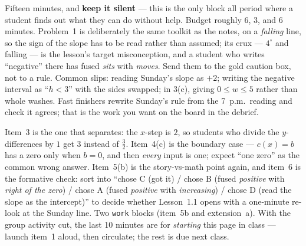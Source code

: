 \documentclass[10pt]{article}
\begin{document}
\begin{teachernote}
Fifteen minutes, and \textbf{keep it silent} --- this is the only block all period where a student
finds out what they can do without help. Budget roughly 6, 3, and 6 minutes. Problem~1 is
deliberately the same toolkit as the notes, on a \emph{falling} line, so the sign of the slope has
to be read rather than assumed; its crux --- $4^\circ$ and falling --- is the lesson's target
misconception, and a student who writes ``negative'' there has fused \emph{sits} with \emph{moves}.
Send them to the gold caution box, not to a rule. Common slips: reading Sunday's slope as $+2$;
writing the negative interval as ``$h<3$'' with the sides swapped; in 3(c), giving $0\le w\le5$
rather than whole washes. Fast finishers rewrite Sunday's rule from the 7~p.m.\ reading and check
it agrees; that is the work you want on the board in the debrief.
\end{teachernote}

\begin{teachernote}[Homework]
Item~3 is the one that separates: the $x$-step is $2$, so students who divide the $y$-differences by
$1$ get $3$ instead of $\tfrac32$. Item~4(c) is the boundary case --- $c(x)=b$ has a zero only when
$b=0$, and then \emph{every} input is one; expect ``one zero'' as the common wrong answer. Item~5(b)
is the story-vs-math point again, and item~6 is the formative check: sort into ``chose C (got it) /
chose B (fused \emph{positive} with \emph{right of the zero}) / chose A (fused \emph{positive} with
\emph{increasing}) / chose D (read the slope as the intercept)'' to decide whether Lesson~1.1 opens
with a one-minute re-look at the Sunday line. Two \texttt{work} blocks (item~5b and extension~a).
With the group activity cut, the last 10 minutes are for \emph{starting} this page in class ---
launch item~1 aloud, then circulate; the rest is due next class.
\end{teachernote}
\end{document}
